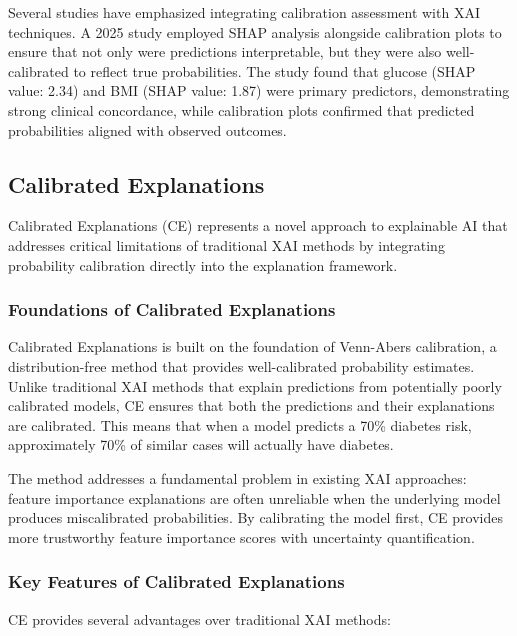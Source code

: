 Several studies have emphasized integrating calibration assessment with XAI techniques. A 2025 study employed SHAP analysis alongside calibration plots to ensure that not only were predictions interpretable, but they were also well-calibrated to reflect true probabilities. The study found that glucose (SHAP value: 2.34) and BMI (SHAP value: 1.87) were primary predictors, demonstrating strong clinical concordance, while calibration plots confirmed that predicted probabilities aligned with observed outcomes.

\subsection{Calibrated Explanations}

Calibrated Explanations (CE) represents a novel approach to explainable AI that addresses critical limitations of traditional XAI methods by integrating probability calibration directly into the explanation framework.

\subsubsection{Foundations of Calibrated Explanations}

Calibrated Explanations is built on the foundation of Venn-Abers calibration, a distribution-free method that provides well-calibrated probability estimates. Unlike traditional XAI methods that explain predictions from potentially poorly calibrated models, CE ensures that both the predictions and their explanations are calibrated. This means that when a model predicts a 70\% diabetes risk, approximately 70\% of similar cases will actually have diabetes.

The method addresses a fundamental problem in existing XAI approaches: feature importance explanations are often unreliable when the underlying model produces miscalibrated probabilities. By calibrating the model first, CE provides more trustworthy feature importance scores with uncertainty quantification.

\subsubsection{Key Features of Calibrated Explanations}

CE provides several advantages over traditional XAI methods:

